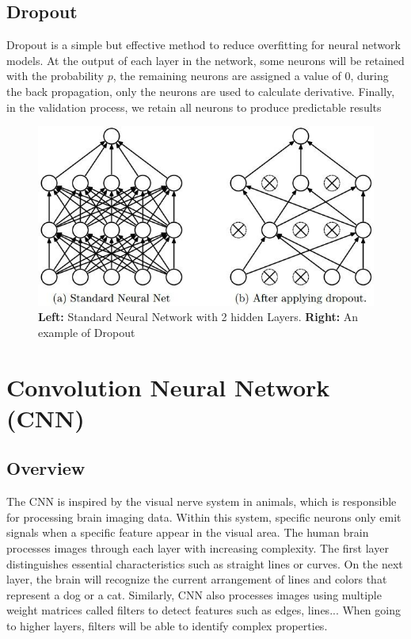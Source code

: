 \subsection{Dropout}
Dropout \cite{Srivastava:2014:DSW:2627435.2670313} is a simple but effective method to reduce overfitting for neural network models.
At the output of each layer in the network, some neurons will be retained with the probability $p$, the remaining neurons are assigned a value of 0, during the back propagation, only the neurons are used to calculate derivative. Finally, in the validation process, we retain all neurons to produce predictable results
\begin{center}
	\begin{figure}[H]
		\centering
		\includegraphics[width=0.75\columnwidth]{images/chap2/dropout.jpg}
		\caption{\textbf{Left:} Standard Neural Network with 2 hidden Layers. \textbf{Right:} An example of Dropout}
		\label{chap2:dropout}
	\end{figure}
\end{center}
\vspace{-1cm}
\section{Convolution Neural Network (CNN)}
\subsection{Overview}
The CNN is inspired by the visual nerve system in animals, which is responsible for processing brain imaging data. Within this system, specific neurons only emit signals when a specific feature appear in the visual area. The human brain processes images through each layer with increasing complexity. The first layer distinguishes essential characteristics such as straight lines or curves. On the next layer, the brain will recognize the current arrangement of lines and colors that represent a dog or a cat. Similarly, CNN also processes images using multiple weight matrices called filters to detect features such as edges, lines... When going to higher layers, filters will be able to identify complex properties.

